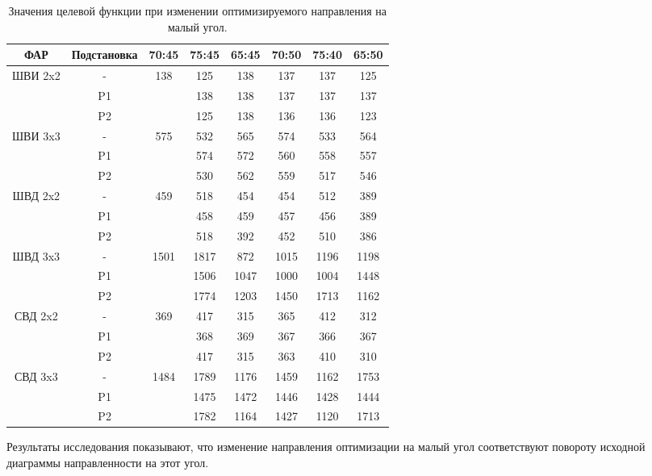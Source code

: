 \begin{table}[!h]
\centering
\begin{tabular}{|c|c|c|c|c|c|c|c|}
    \hline
    \textbf{ФАР} & \textbf{Подстановка} & \textbf{70:45} & \textbf{75:45} & \textbf{65:45} & \textbf{70:50} & \textbf{75:40} & \textbf{65:50}\\
    \hline
    \multirow{3}{*}{ШВИ 2x2} & - & \multirow{3}{*}{138} & 125 & 138 & 137 & 137 & 125\\
    & P1 &  & 138 & 138 & 137 & 137 & 137\\
    & P2 &  & 125 & 138 & 136 & 136 & 123\\
    \hline
    \multirow{3}{*}{ШВИ 3x3} & - & \multirow{3}{*}{575} & 532 & 565 & 574 & 533 & 564\\
    & P1 &  & 574 & 572 & 560 & 558 & 557\\
    & P2 &  & 530 & 562 & 559 & 517 & 546\\
    \hline
    \multirow{3}{*}{ШВД 2x2} & - & \multirow{3}{*}{459} & 518 & 454 & 454 & 512 & 389\\
    & P1 &  & 458 & 459 & 457 & 456 & 389\\
    & P2 &  & 518 & 392 & 452 & 510 & 386\\
    \hline
    \multirow{3}{*}{ШВД 3x3} & - & \multirow{3}{*}{1501} & 1817 & 872 & 1015 & 1196 & 1198\\
    & P1 &  & 1506 & 1047 & 1000 & 1004 & 1448\\
    & P2 &  & 1774 & 1203 & 1450 & 1713 & 1162\\
    \hline
    \multirow{3}{*}{СВД 2x2} & - & \multirow{3}{*}{369} & 417 & 315 & 365 & 412 & 312\\
    & P1 &  & 368 & 369 & 367 & 366 & 367\\
    & P2 &  & 417 & 315 & 363 & 410 & 310\\
    \hline
    \multirow{3}{*}{СВД 3x3} & - & \multirow{3}{*}{1484} & 1789 & 1176 & 1459 & 1162 & 1753\\
    & P1 &  & 1475 & 1472 & 1446 & 1428 & 1444\\
    & P2 &  & 1782 & 1164 & 1427 & 1120 & 1713\\
    \hline
\end{tabular}
    \caption{Значения целевой функции при изменении оптимизируемого направления на малый угол.}
    \label{tab:stability}
\end{table}

Результаты исследования показывают, что изменение направления оптимизации на малый угол соответствуют повороту исходной диаграммы направленности на этот угол.

